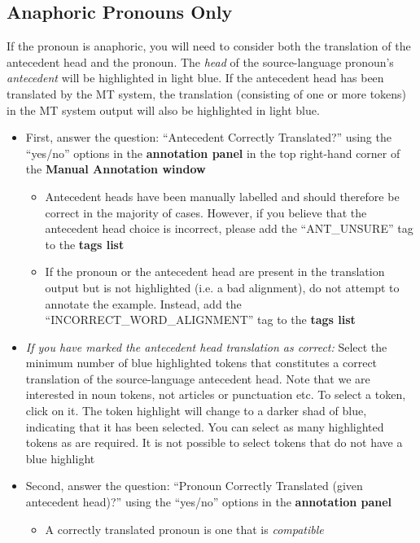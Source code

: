 \documentclass[11pt]{article} %
\begin{document}
\subsection{Anaphoric Pronouns Only}
\label{AnaphoricGuidelines}

If the pronoun is anaphoric, you will need to consider both the translation of the antecedent head and the pronoun. The \textit{head} of the source-language pronoun's \textit{antecedent} will be highlighted in light blue. If the antecedent head has been translated by the MT system, the translation (consisting of one or more tokens) in the MT system output will also be highlighted in light blue.

\begin{itemize}
  \item First, answer the question: ``Antecedent Correctly Translated?'' using the ``yes/no'' options in the \textbf{annotation panel} in the top right-hand corner of the \textbf{Manual Annotation window}
  \begin{itemize}
    \item Antecedent heads have been manually labelled and should therefore be correct in the majority of cases. However, if you believe that the antecedent head choice is incorrect, please add the ``ANT\_UNSURE'' tag to the \textbf{tags list}
    \item If the pronoun or the antecedent head are present in the translation output but is not highlighted (i.e. a bad alignment), do not attempt to annotate the example. Instead, add the ``INCORRECT\_WORD\_ALIGNMENT'' tag to the \textbf{tags list}
  \end{itemize}  
  \item \textit{If you have marked the antecedent head translation as correct:} Select the minimum number of blue highlighted tokens that constitutes a correct translation of the source-language antecedent head. Note that we are interested in noun tokens, not articles or punctuation etc. To select a token, click on it. The token highlight will change to a darker shad of blue, indicating that it has been selected. You can select as many highlighted tokens as are required. It is not possible to select tokens that do not have a blue highlight
  \item Second, answer the question: ``Pronoun Correctly Translated (given antecedent head)?'' using the ``yes/no'' options in the \textbf{annotation panel}
  \begin{itemize}
    \item A correctly translated pronoun is one that is \textit{compatible}

\end{itemize}
\end{itemize}
\end{document}
